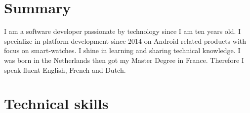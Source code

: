 \documentclass[a4paper,11pt,sans]{moderncv}
\begin{document}
\maketitle

\section{Summary}
I am a software developer passionate by technology since I am ten years old.
I specialize in platform development since 2014 on Android related products with focus on smart-watches.
I shine in learning and sharing technical knowledge.
I was born in the Netherlands then got my Master Degree in France.
Therefore I speak fluent English, French and Dutch.

\section{Technical skills}
\begin{cvcolumns}
\end{cvcolumns}
    
\end{document}
